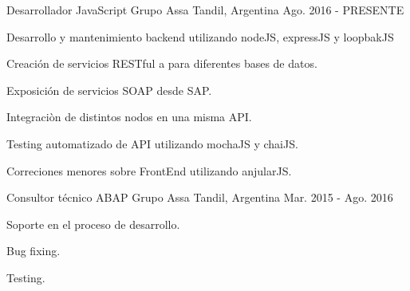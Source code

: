 


\begin{cventries}


\cventry
{Desarrollador JavaScript} %
{Grupo Assa} %
{Tandil, Argentina} %
{Ago. 2016 - PRESENTE} %
{ %
\begin{cvitems}
\item {Desarrollo y mantenimiento backend utilizando nodeJS, expressJS y loopbakJS}
\item {Creación de servicios RESTful a para diferentes bases de datos.}
\item {Exposición de servicios SOAP desde SAP.}
\item {Integraciòn de distintos nodos en una misma API.}
\item {Testing automatizado de API utilizando mochaJS y chaiJS.}
\item {Correciones menores sobre FrontEnd utilizando anjularJS.}
\end{cvitems}
}

\cventry
{Consultor técnico ABAP} %
{Grupo Assa} %
{Tandil, Argentina} %
{Mar. 2015 - Ago. 2016} %
{ %
\begin{cvitems}
\item {Soporte en el proceso de desarrollo.}
\item {Bug fixing.}
\item {Testing.}
\end{cvitems}
}

\end{cventries}
